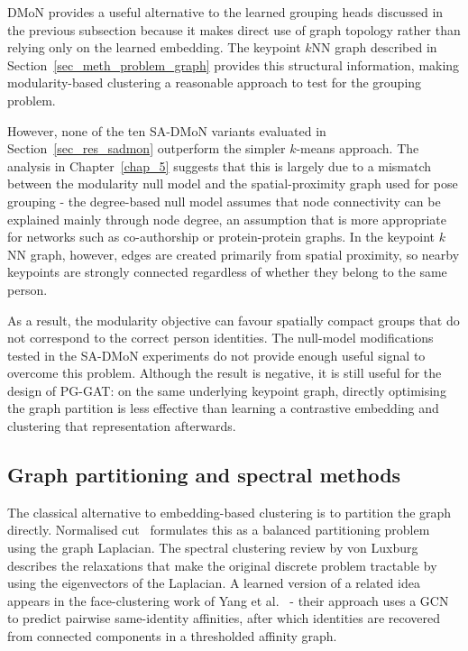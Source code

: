 DMoN provides a useful alternative to the learned grouping heads discussed in the previous subsection
because it makes direct use of graph topology rather than relying only on the learned embedding.
The keypoint $k$NN graph described in Section~\ref{sec_meth_problem_graph} provides this structural information,
making modularity-based clustering a reasonable approach to test for the grouping problem.

However, none of the ten SA-DMoN variants evaluated in Section~\ref{sec_res_sadmon}
outperform the simpler $k$-means approach.
The analysis in Chapter~\ref{chap_5} suggests
that this is largely due to a mismatch between the modularity null model
and the spatial-proximity graph used for pose grouping -
the degree-based null model assumes that node connectivity can be explained mainly through node degree,
an assumption that is more appropriate for networks such as co-authorship or protein-protein graphs.
In the keypoint $k$NN graph, however, edges are created primarily from spatial proximity,
so nearby keypoints are strongly connected regardless of whether they belong to the same person.

As a result, the modularity objective can favour spatially compact groups
that do not correspond to the correct person identities.
The null-model modifications tested in the SA-DMoN experiments
do not provide enough useful signal to overcome this problem.
Although the result is negative, it is still useful for the design of PG-GAT:
on the same underlying keypoint graph,
directly optimising the graph partition is less effective
than learning a contrastive embedding and clustering that representation afterwards.

\subsection{Graph partitioning and spectral methods}
\label{sec_lit_rep_learn_partition}

The classical alternative to embedding-based clustering is to partition the graph directly.
Normalised cut~\cite{shi2000ncut} formulates this as a balanced partitioning problem using the graph Laplacian.
The spectral clustering review by von Luxburg~\cite{vonluxburg2007spectral}
describes the relaxations that make the original discrete problem tractable
by using the eigenvectors of the Laplacian.
A learned version of a related idea
appears in the face-clustering work of Yang et al.~\cite{yang2019face, yang2020gcnve} -
their approach uses a GCN to predict pairwise same-identity affinities,
after which identities are recovered from connected components in a thresholded affinity graph.

